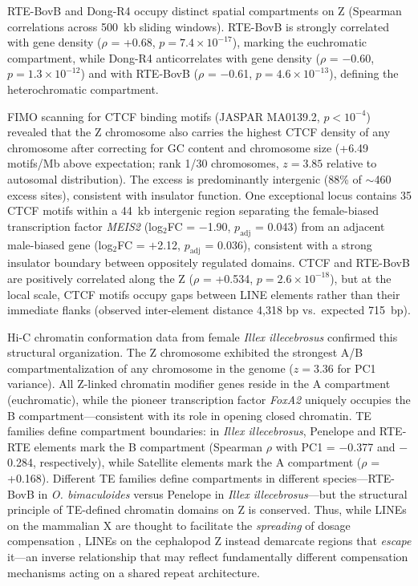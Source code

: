 \documentclass[12pt]{article}
\newcommand{\citep}{\parencite}
\newcommand{\illex}{\textit{Illex illecebrosus}\xspace}
\begin{document}
RTE-BovB and Dong-R4 occupy distinct spatial compartments on Z
(Spearman correlations across 500~kb sliding windows).
RTE-BovB is strongly correlated with gene density
($\rho$ = +0.68, $p = 7.4 \times 10^{-17}$),
marking the euchromatic compartment,
while Dong-R4 anticorrelates with gene density
($\rho$ = $-$0.60, $p = 1.3 \times 10^{-12}$)
and with RTE-BovB ($\rho$ = $-$0.61, $p = 4.6 \times 10^{-13}$),
defining the heterochromatic compartment.

FIMO scanning for CTCF binding motifs (JASPAR MA0139.2, $p < 10^{-4}$)
revealed that the Z chromosome also carries the highest CTCF density
of any chromosome after correcting for GC content and chromosome size
(+6.49 motifs/Mb above expectation;
rank 1/30 chromosomes, $z = 3.85$ relative to autosomal distribution).
The excess is predominantly intergenic (88\% of $\sim$460 excess sites),
consistent with insulator function.
One exceptional locus contains 35 CTCF motifs within a 44~kb intergenic region
separating the female-biased transcription factor \textit{MEIS2}
(log$_2$FC = $-$1.90, $p_\text{adj}$ = 0.043) from an adjacent male-biased gene
(log$_2$FC = $+$2.12, $p_\text{adj}$ = 0.036),
consistent with a strong insulator boundary between oppositely regulated domains.
CTCF and RTE-BovB are positively correlated along the Z
($\rho$ = +0.534, $p = 2.6 \times 10^{-18}$),
but at the local scale, CTCF motifs occupy gaps between LINE elements
rather than their immediate flanks
(observed inter-element distance 4,318 bp vs.\ expected 715~bp).

Hi-C chromatin conformation data from female \illex
confirmed this structural organization.
The Z chromosome exhibited the strongest A/B compartmentalization
of any chromosome in the genome ($z = 3.36$ for PC1 variance).
All Z-linked chromatin modifier genes reside in the A compartment (euchromatic),
while the pioneer transcription factor \textit{FoxA2}
uniquely occupies the B compartment---consistent with its role
in opening closed chromatin.
TE families define compartment boundaries:
in \illex, Penelope and RTE-RTE elements mark the B compartment
(Spearman $\rho$ with PC1 = $-$0.377 and $-$0.284, respectively),
while Satellite elements mark the A compartment ($\rho$ = +0.168).
Different TE families define compartments in different species---RTE-BovB in
\textit{O. bimaculoides} versus Penelope in \illex---but
the structural principle of TE-defined chromatin domains on Z is conserved.
Thus, while LINEs on the mammalian X are thought to facilitate the
\textit{spreading} of dosage compensation \citep{lyon1998x},
LINEs on the cephalopod Z instead demarcate regions that
\textit{escape} it---an inverse relationship that may reflect
fundamentally different compensation mechanisms acting on a shared
repeat architecture.
\end{document}
